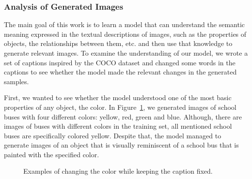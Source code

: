 \documentclass{article} %
\begin{document}
\subsubsection{Analysis of Generated Images}
The main goal of this work is to learn a model that can understand the semantic meaning expressed in the textual descriptions of images, such as the properties of objects, the relationships between them, etc. and then use that knowledge to generate relevant images. To examine the understanding of our model, we wrote a set of captions inspired by the COCO dataset and changed some words in the captions to see whether the model made the relevant changes in the generated samples.

First, we wanted to see whether the model understood one of the most basic properties of any object, the color. In Figure~\ref{fig:genimages1}, we generated images of school buses with four different colors: yellow, red, green and blue. Although, there are images of buses with different colors in the training set, all mentioned school buses are specifically colored yellow. Despite that, the model managed to generate images of an object that is visually reminiscent of a school bus that is painted with the specified color.

\begin{figure}[!h]
\captionsetup[subfigure]{labelformat=empty}
\begin{center}
\quad
%
\quad
%
\quad
%
\quad
%
\end{center}
\caption{Examples of changing the color while keeping the caption fixed.}
\label{fig:genimages1}
\vspace{-0.3cm}
\end{figure}
\end{document}
